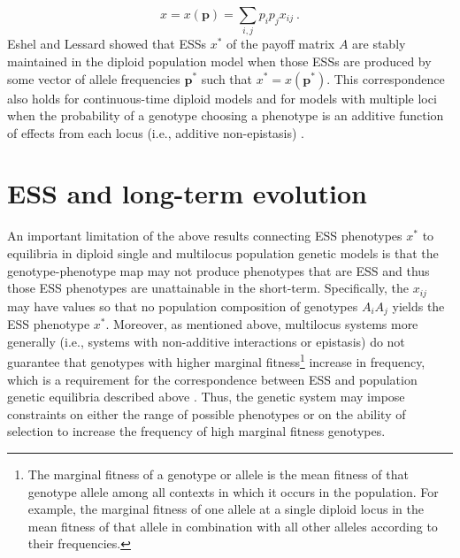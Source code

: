 \documentclass[11pt]{article}
\newcommand{\ess}[1]{#1^*}
\renewcommand{\vec}[1]{\symbf{#1}}
\begin{document}
\begin{equation*}
  x = x(\vec{p}) = \sum_{i,j} p_{i} p_{j} x_{ij} \: .
\end{equation*}
Eshel and Lessard showed \cite{Eshel:1982,Lessard:1984} that ESSs $\ess{x}$ of the payoff matrix $A$ are stably maintained in the diploid population model when those ESSs are produced by some vector of allele frequencies $\ess{\vec{p}}$ such that $\ess{x} = x(\ess{\vec{p}})$. This correspondence also holds for continuous-time diploid models \cite{Sigmund:1987,Cressman:1988,Cressman:Hofbauer:1996,Hofbauer:Sigmund:1998} and for models with multiple loci when the probability of a genotype choosing a phenotype is an additive function of effects from each locus (i.e., additive non-epistasis) \cite{Eshel:1982}.

\section{ESS and long-term evolution}

An important limitation of the above results connecting ESS phenotypes $\ess{x}$ to equilibria in diploid single and multilocus population genetic models is that the genotype-phenotype map may not produce phenotypes that are ESS and thus those ESS phenotypes are unattainable in the short-term. Specifically, the $x_{ij}$ may have values so that no population composition of genotypes $A_{i} A_{j}$ yields the ESS phenotype $\ess{x}$. Moreover, as mentioned above, multilocus systems more generally (i.e., systems with non-additive interactions or epistasis) do not guarantee that genotypes with higher marginal fitness\footnote{The marginal fitness of a genotype or allele is the mean fitness of that genotype allele among all contexts in which it occurs in the population. For example, the marginal fitness of one allele at a single diploid locus in the mean fitness of that allele in combination with all other alleles according to their frequencies.} increase in frequency, which is a requirement for the correspondence between ESS and population genetic equilibria described above \cite{Eshel:1982,Hofbauer:Sigmund:1998}. Thus, the genetic system may impose constraints on either the range of possible phenotypes or on the ability of selection to increase the frequency of high marginal fitness genotypes.
\end{document}
